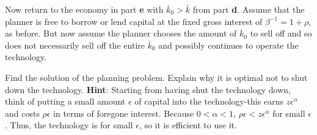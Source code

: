 \medskip
{} Now return to the economy in part {\bf e} with $\overline{k}_0>\bar k$ from part {\bf d}.  Assume that the planner is free to borrow or lend capital at the fixed gross interest of $\beta^{-1}=1+\rho$, as before. But now assume the planner chooses the  amount of $\overline{k}_0$ to sell off and so does not necessarily sell off the entire $\overline{k}_0$ and possibly continues to operate the technology.

\medskip
{} Find the solution of the planning problem.\medskip
{} Explain why it is optimal not to shut down the technology. {\bf Hint}: Starting from having shut the technology down, think of putting a small amount $\epsilon$ of capital into the technology-this earns $z\epsilon^\alpha$ and costs $\rho \epsilon$ in terms of foregone interest. Because $0<\alpha<1$, $\rho\epsilon<z\epsilon^\alpha$ for small $\epsilon$. Thus, the technology is  for small $\epsilon$, so it is efficient to use it.




\bye






\bye
